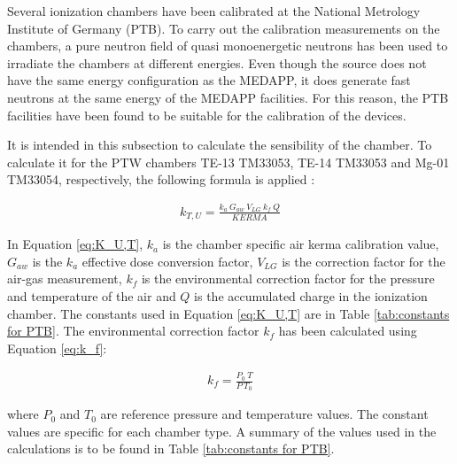 Several ionization chambers have been calibrated at the National Metrology Institute of Germany (PTB). To carry out the calibration measurements on the chambers, a pure neutron field of quasi monoenergetic neutrons has been used to irradiate the chambers at different energies. Even though the source does not have the same energy configuration as the MEDAPP, it does generate fast neutrons at the same energy of the MEDAPP facilities. For this reason, the PTB facilities have been found to be suitable for the calibration of the devices. 

It is intended in this subsection to calculate the sensibility of the chamber. To calculate it for the PTW chambers TE-13 TM33053, TE-14 TM33053 and Mg-01 TM33054, respectively, the following formula is applied \cite{ReportPTW2018}:

\begin{align}
\label{eq:K_U,T}
    {k_{T,U} = \frac{k_a \: G_{aw} \: V_{LG} \: k_f \: Q}{KERMA}}
\end{align}

In Equation \ref{eq:K_U,T}, $k_a$ is the chamber specific air kerma calibration value, $G_{aw}$ is the $k_a$ effective dose conversion factor, $V_{LG}$ is the correction factor for the air-gas measurement, $k_f$ is the environmental correction factor for the pressure and temperature of the air and $Q$ is the accumulated charge in the ionization chamber. The constants used in Equation \ref{eq:K_U,T} are in Table \ref{tab:constants for PTB}. The environmental correction factor $k_f$ has been calculated using Equation \ref{eq:k_f}:

\begin{align}
\label{eq:k_f}
    {k_f = \frac{P_0 \: T}{P \: T_0}}
\end{align}

where $P_0$ and $T_0$ are reference pressure and temperature values. The  constant values are specific for each chamber type. A summary of the values used in the calculations is to be found in Table \ref{tab:constants for PTB}.

